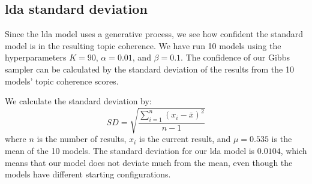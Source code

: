 \subsection{\Gls{lda} standard deviation}\label{sec:std_dev}
Since the \gls{lda} model uses a generative process, we see how confident the standard model is in the resulting topic coherence.
We have run 10 models using the hyperparameters $K=90$, $\alpha=0.01$, and $\beta=0.1$.
The confidence of our Gibbs sampler can be calculated by the standard deviation of the results from the 10 models' topic coherence scores.

We calculate the standard deviation by:
\begin{equation}
	SD = \sqrt{\frac{\sum_{i=1}^{n}(x_i-\bar{x})^2}{n-1}}
\end{equation}
where $n$ is the number of results, $x_i$ is the current result, and $\mu = 0.535$ is the mean of the 10 models.
The standard deviation for our \gls{lda} model is $0.0104$, which means that our model does not deviate much from the mean, even though the models have different starting configurations.
